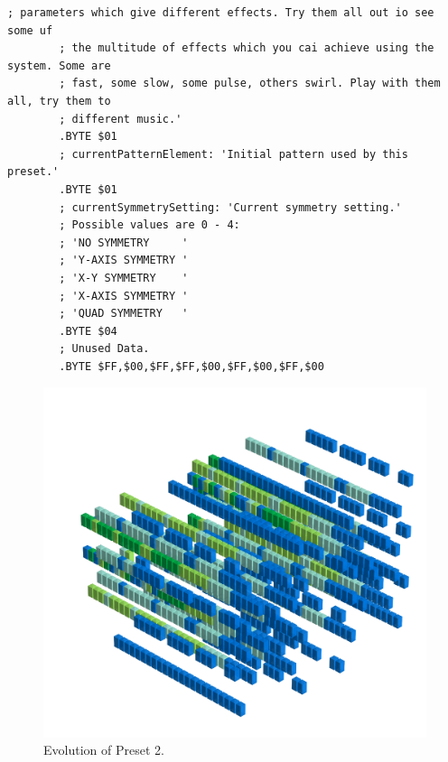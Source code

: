 \begin{lstlisting}[basicstyle=\tiny,caption=Source code for Preset 1.]
        ; parameters which give different effects. Try them all out io see some uf
        ; the multitude of effects which you cai achieve using the system. Some are
        ; fast, some slow, some pulse, others swirl. Play with them all, try them to
        ; different music.'
        .BYTE $01
        ; currentPatternElement: 'Initial pattern used by this preset.'
        .BYTE $01
        ; currentSymmetrySetting: 'Current symmetry setting.'
        ; Possible values are 0 - 4:
        ; 'NO SYMMETRY     '
        ; 'Y-AXIS SYMMETRY '
        ; 'X-Y SYMMETRY    '
        ; 'X-AXIS SYMMETRY '
        ; 'QUAD SYMMETRY   '
        .BYTE $04
        ; Unused Data.
        .BYTE $FF,$00,$FF,$FF,$00,$FF,$00,$FF,$00
\end{lstlisting}


\clearpage                                                                 
\begin{figure}[H]                                                          
    \centering                                                             
    \begin{adjustbox}{width=14cm,center}                                   
      \includegraphics[width=14cm]{src/presets/pattern2-45.png}%
    \end{adjustbox}                                                        
\caption{Evolution of Preset 2.}                                           
\end{figure}                                                               
\clearpage                                                                 
                                                                           
